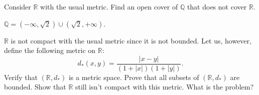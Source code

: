   \begin{exercise}
    Consider $\mathbb{R}$ with the usual metric. Find an open cover of $\mathbb{Q}$ that does not 
    cover $\mathbb{R}$.
  \end{exercise}
  \begin{solution}
    $\mathbb{Q} = (-\infty, \sqrt{2}) \cup (\sqrt{2}, +\infty)$. 
  \end{solution}

  \begin{exercise}
    $\mathbb{R}$ is not compact with the usual metric since it is not bounded. Let us,
    however, define the following metric on $\mathbb{R}$:
    \begin{equation}
      d_{\ast}(x,y) = \frac{|x-y|}{(1+|x|)(1+|y|)}.
    \end{equation}
    Verify that $(\mathbb{R},d_{\ast})$ is a metric space. Prove that all subsets of $(\mathbb{R},d_{\ast})$ are
    bounded. Show that $\mathbb{R}$ still isn't compact with this metric. What is the
    problem?
  \end{exercise}
